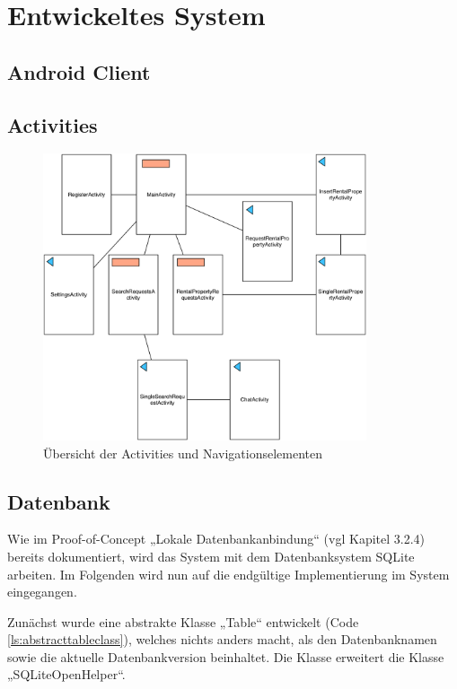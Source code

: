 
\section{Entwickeltes System}


\subsection{Android Client}

\subsection{Activities}


\begin{figure}[H]
	\centering
	\includegraphics[width=0.85\textwidth]{./images/activitiesoverview.png}
	\caption{Übersicht der Activities und Navigationselementen}
	\label{fg:activitiesoverview}
\end{figure}


\subsection{Datenbank}

Wie im Proof-of-Concept „Lokale Datenbankanbindung“ (vgl Kapitel 3.2.4) bereits dokumentiert, wird das System mit dem Datenbanksystem SQLite arbeiten. Im Folgenden wird nun auf die endgültige Implementierung im System eingegangen.

Zunächst wurde eine abstrakte Klasse „Table“ entwickelt (Code \ref{ls:abstracttableclass}), welches nichts anders macht, als den Datenbanknamen sowie die aktuelle Datenbankversion beinhaltet. Die Klasse erweitert die Klasse „SQLiteOpenHelper“.

